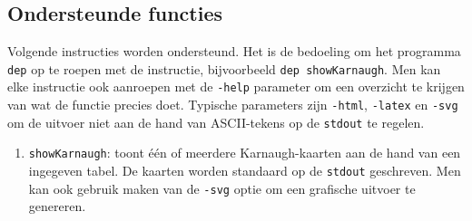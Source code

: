 \subsection{Ondersteunde functies}
Volgende instructies worden ondersteund. Het is de bedoeling om het programma \texttt{dep} op te roepen met de instructie, bijvoorbeeld \texttt{dep showKarnaugh}. Men kan elke instructie ook aanroepen met de \texttt{-help} parameter om een overzicht te krijgen van wat de functie precies doet. Typische parameters zijn \texttt{-html}, \texttt{-latex} en \texttt{-svg} om de uitvoer niet aan de hand van ASCII-tekens op de \texttt{stdout} te regelen.
\begin{enumerate}
 \item \texttt{showKarnaugh}: toont \'e\'en of meerdere Karnaugh-kaarten aan de hand van een ingegeven tabel. De kaarten worden standaard op de \texttt{stdout} geschreven. Men kan ook gebruik maken van de \texttt{-svg} optie om een grafische uitvoer te genereren.
\end{enumerate}
